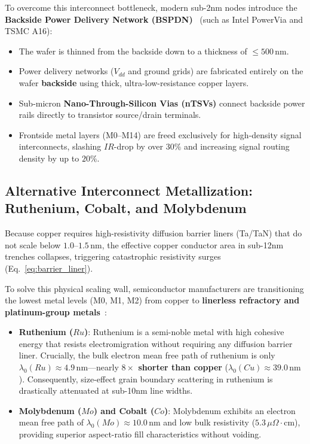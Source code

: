 To overcome this interconnect bottleneck, modern sub-2nm nodes introduce the \textbf{Backside Power Delivery Network (BSPDN)}~\cite{IntelPowerVia2023} (such as Intel PowerVia and TSMC A16):
\begin{itemize}
    \item The wafer is thinned from the backside down to a thickness of $\le 500\,\mathrm{nm}$.
    \item Power delivery networks ($V_{dd}$ and ground grids) are fabricated entirely on the wafer \textbf{backside} using thick, ultra-low-resistance copper layers.
    \item Sub-micron \textbf{Nano-Through-Silicon Vias (nTSVs)} connect backside power rails directly to transistor source/drain terminals.
    \item Frontside metal layers (M0--M14) are freed exclusively for high-density signal interconnects, slashing $IR$-drop by over $30\%$ and increasing signal routing density by up to $20\%$.
\end{itemize}

\subsection{Alternative Interconnect Metallization: Ruthenium, Cobalt, and Molybdenum}
\label{subsec:ch1_alt_metals}

Because copper requires high-resistivity diffusion barrier liners (Ta/TaN) that do not scale below $1.0\text{--}1.5\,\mathrm{nm}$, the effective copper conductor area in sub-12nm trenches collapses, triggering catastrophic resistivity surges (Eq.~\ref{eq:barrier_liner}).

To solve this physical scaling wall, semiconductor manufacturers are transitioning the lowest metal levels (M0, M1, M2) from copper to \textbf{linerless refractory and platinum-group metals}~\cite{Adelmann2018}:
\begin{itemize}
    \item \textbf{Ruthenium ($Ru$)}: Ruthenium is a semi-noble metal with high cohesive energy that resists electromigration without requiring any diffusion barrier liner. Crucially, the bulk electron mean free path of ruthenium is only $\lambda_0(Ru) \approx 4.9\,\mathrm{nm}$—nearly \textbf{$8\times$ shorter than copper} ($\lambda_0(Cu) \approx 39.0\,\mathrm{nm}$). Consequently, size-effect grain boundary scattering in ruthenium is drastically attenuated at sub-10nm line widths.
    \item \textbf{Molybdenum ($Mo$) and Cobalt ($Co$)}: Molybdenum exhibits an electron mean free path of $\lambda_0(Mo) \approx 10.0\,\mathrm{nm}$ and low bulk resistivity ($5.3\,\mu\Omega\cdot\mathrm{cm}$), providing superior aspect-ratio fill characteristics without voiding.
\end{itemize}

